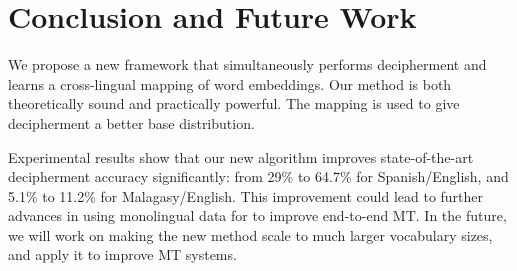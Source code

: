 \section{Conclusion and Future Work}

We propose a new framework that simultaneously performs decipherment and learns a cross-lingual mapping of word embeddings. Our method is both theoretically sound and practically powerful. The mapping is used to give decipherment a better base distribution. 

Experimental results show that our new algorithm improves state-of-the-art decipherment accuracy significantly: from 29\% to 64.7\% for Spanish/English, and 5.1\% to 11.2\% for Malagasy/English. This improvement could lead to further advances in using monolingual data for to improve end-to-end MT.
In the future, we will work on making the new method scale to much larger vocabulary sizes, and apply it to improve MT systems.
